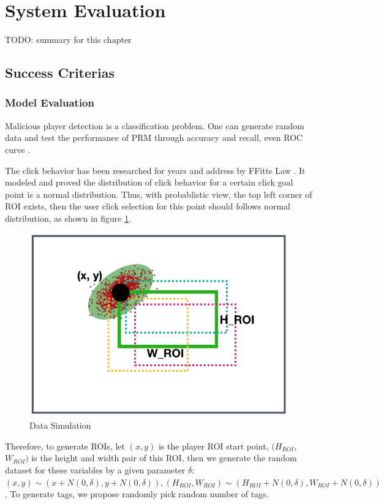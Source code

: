 \section{System Evaluation}

TODO: summary for this chapter

\subsection{Success Criterias}

  \subsubsection{Model Evaluation}

  Malicious player detection is a classification problem. 
  One can generate random data and test the performance of PRM through accuracy and recall, even ROC curve \cite{hanley1982meaning}.

  The click behavior has been researched for years and address by FFitts Law \cite{bi2013ffitts}.
  It modeled and proved the distribution of click behavior for a certain click goal point is a normal distribution.
  Thus, with probablistic view, the top left corner of ROI exists, then the user click selection 
  for this point should follows normal distribution, as shown in figure \ref{fig:evaluation}.

  \begin{figure}[htp]
  \centering
  \includegraphics[width=0.5\columnwidth]{figures/evaluation}
  \caption{Data Simulation}
  \label{fig:evaluation}
  \end{figure}

  Therefore, to generate ROIs, let $(x, y)$ is the player ROI start point,  $(H_{ROI}$, $W_{ROI})$ is the height
  and width pair of this ROI, then we generate the random dataset for these variables by a given
  parameter $\delta$: $(x, y) \sim (x+N(0, \delta), y+N(0, \delta)), (H_{ROI}, W_{ROI}) \sim (H_{ROI}+N(0, \delta), W_{ROI}+N(0, \delta))$.
  To generate tags, we propose randomly pick random number of tags.

